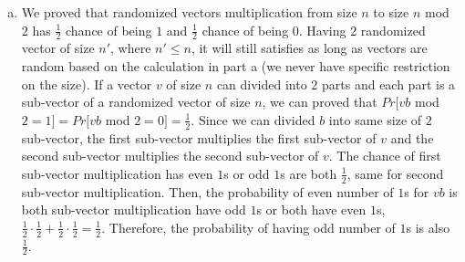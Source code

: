 \documentclass[11pt]{article}%
\begin{document}
\begin{questions}[1]
\begin{enumerate}[(a)]
    \newline
    \item 
    We proved that randomized vectors multiplication from size $n$ to size $n$ mod $2$ has $\frac {1}{2}$ chance of being $1$ and $\frac {1}{2}$ chance of being $0$. Having 2 randomized vector of size $n'$, where $n' \leq n$, it will still satisfies as long as vectors are random based on the calculation in part a (we never have specific restriction on the size). 
    \newline
    \newline
    If a vector $v$ of size $n$ can divided into $2$ parts and each part is a sub-vector of a randomized vector of size $n$, we can proved that $Pr[vb$ mod $2=1] = Pr[vb$ mod $2= 0] =  \frac{1}{2}$. Since we can divided $b$ into same size of $2$ sub-vector, the first sub-vector multiplies the first sub-vector of $v$ and the second sub-vector multiplies the second sub-vector of $v$. The chance of first sub-vector multiplication has even $1$s or odd $1$s are both $\frac{1}{2}$, same for second sub-vector multiplication. Then, the probability of even number of $1$s for $vb$ is both sub-vector multiplication have odd $1$s or both have even $1$s, $\frac{1}{2}\cdot \frac{1}{2} + \frac{1}{2}\cdot \frac{1}{2} = \frac{1}{2}$. Therefore, the probability of having odd number of $1$s is also $\frac{1}{2}$. 
    

\end{enumerate}
\end{questions}
\end{document}

